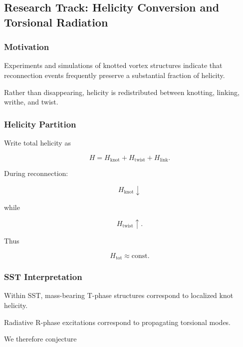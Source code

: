     
\subsection{Research Track: Helicity Conversion and Torsional Radiation}
    
    \subsubsection{Motivation}
        
        Experiments and simulations of knotted vortex structures indicate that
        reconnection events frequently preserve a substantial fraction of helicity.
        
        Rather than disappearing, helicity is redistributed between knotting,
        linking, writhe, and twist.
    
    \subsubsection{Helicity Partition}
        
        Write total helicity as
        
        \[
            H
            =
            H_{\mathrm{knot}}
            +
            H_{\mathrm{twist}}
            +
            H_{\mathrm{link}}.
        \]
        
        During reconnection:
        
        \[
            H_{\mathrm{knot}}
            \downarrow
        \]
        
        while
        
        \[
            H_{\mathrm{twist}}
            \uparrow .
        \]
        
        Thus
        
        \[
            H_{\mathrm{tot}}
            \approx
            \mathrm{const}.
        \]
    
    \subsubsection{SST Interpretation}
        
        Within SST, mass-bearing T-phase structures correspond to localized knot
        helicity.
        
        Radiative R-phase excitations correspond to propagating torsional modes.
        
        We therefore conjecture
        
